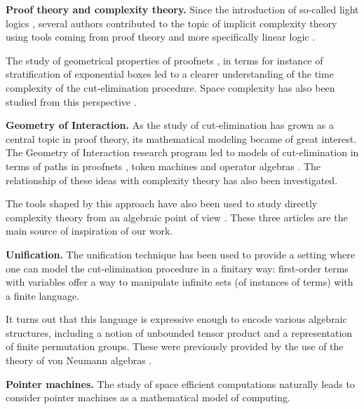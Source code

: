 \textbf{Proof theory and complexity theory.} Since the introduction of so-called light logics \cite{girard_light_1994}, several authors contributed to the topic of implicit complexity theory using tools coming from proof theory and more specifically linear logic \cite{girard_linear_1987}.

The study of geometrical properties of proofnets \cite{girard_linear_1987}, in terms for instance of stratification of exponential boxes \cite{baillot_linear_2010} led to a clearer understanding of the time complexity of the cut-elimination procedure. Space complexity has also been studied from this perspective \cite{schopp_stratified_2007,gaboardi_logical_2008}.

\smallskip\noindent
\textbf{Geometry of Interaction.} As the study of cut-elimination has grown as a central topic in proof theory, its mathematical modeling became of great interest.
The Geometry of Interaction \cite{girard_towards_1989} research program led to models of cut-elimination in terms of paths in proofnets \cite{asperti_paths_1994}, token machines \cite{laurent_token_2001} and operator algebras \cite{girard_geometry_1989}.
The relationship of these ideas with complexity theory \cite{schopp_space-efficient_2006,baillot_elementary_2001} has also been investigated.

The tools shaped by this approach have also been used to study directly complexity theory from an algebraic point of view \cite{girard_normativity_2012,aubert_characterizing_2012,seiller_logarithmic_2013}.
These three articles are the main source of inspiration of our work.

\smallskip\noindent
\textbf{Unification.} The unification technique has been used \cite{girard_geometry_1995,baillot_elementary_2001,girard_three_lightings} to provide a setting where one can model the cut-elimination procedure in a finitary way: first-order terms with variables offer a way to manipulate infinite sets (of instances of terms) with a finite language.

It turns out that this language is expressive enough to encode various algebraic structures, including a notion of unbounded tensor product and a representation of finite permutation groups.
These were previously provided by the use of the theory of von Neumann algebras \cite{girard_normativity_2012,aubert_characterizing_2012,seiller_logarithmic_2013}.

\smallskip\noindent
\textbf{Pointer machines.} The study of space efficient computations naturally leads to consider pointer machines as a mathematical model of computing.%

